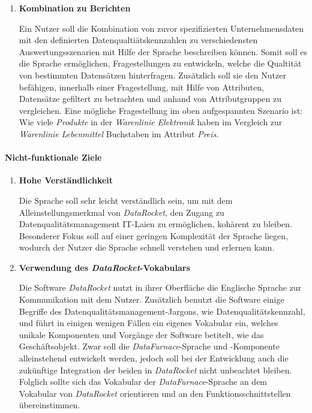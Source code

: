 \documentclass[
  language=german, %
  type=bachelor,%
  ngerman
]{isthesis}
\begin{document}
\begin{content}
\begin{enumerate}
      \item \textbf{Kombination zu Berichten}

        Ein Nutzer soll die Kombination von zuvor spezifizierten
        Unternehmensdaten mit den definierten Datenqualtiätskennzahlen zu
        verschiedensten Auswertungsszenarien mit Hilfe der Sprache beschreiben
        können. Somit soll es die Sprache ermöglichen, Fragestellungen zu
        entwickeln, welche die Qualtität von bestimmten Datensätzen hinterfragen.
        Zusätzlich soll sie den Nutzer befähigen, innerhalb einer
        Fragestellung, mit Hilfe von Attributen, Datensätze gefiltert zu
        betrachten und anhand von Attributgruppen zu vergleichen. Eine mögliche
        Fragestellung im oben aufgespannten Szenario ist: Wie viele
        \textit{Produkte} in der \textit{Warenlinie} \textit{Elektronik} haben
        im Vergleich zur \textit{Warenlinie} \textit{Lebenmittel} Buchstaben im
        Attribut \textit{Preis}.
    \end{enumerate}

  \paragraph{Nicht-funktionale Ziele}
    \begin{enumerate}
      \item \textbf{Hohe Verständlichkeit}

				Die Sprache soll sehr leicht verständlich sein, um mit dem
				Alleinstellungsmerkmal von \textit{DataRocket}, den Zugang zu
				Datenqualitätsmanagement IT-Laien zu ermöglichen, kohärent zu bleiben.
				Besonderer Fokus soll auf einer geringen Komplexität der Sprache
				liegen, wodurch der Nutzer die Sprache schnell verstehen und erlernen
				kann.

      \item \textbf{Verwendung des \textit{DataRocket}-Vokabulars}

				Die Software \textit{DataRocket} nutzt in ihrer Oberfläche die
				Englische Sprache zur Kommunikation mit dem Nutzer. Zusätzlich benutzt
				die Software einige Begriffe des Datenqualitätsmanagement-Jargons, wie
				\zB{} Datenqualitätskennzahl, und führt in einigen wenigen Fällen ein
				eigenes Vokabular ein, welches unikale Komponenten und Vorgänge der
				Software betitelt, wie \zB{} das Geschäftsobjekt. Zwar soll die
				\textit{DataFurnace}-Sprache und -Komponente alleinstehend entwickelt
				werden, jedoch soll bei der Entwicklung auch die zukünftige Integration
				der beiden in \textit{DataRocket} nicht unbeachtet bleiben. Folglich
				sollte sich das Vokabular der \textit{DataFurnace}-Sprache an dem
				Vokabular von \textit{DataRocket} orientieren und an den
				Funktionsschnittstellen übereinstimmen.


\end{enumerate}
\end{content}
\end{document}
